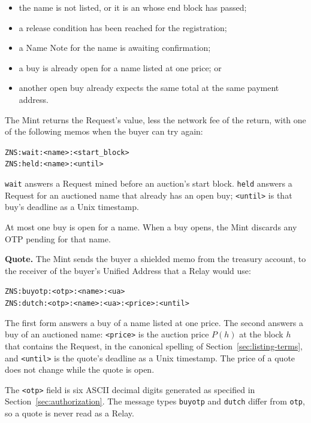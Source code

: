 \begin{itemize}
  \item the name is not listed, or it is an  whose end block has passed;
  \item a release condition has been reached for the registration;
  \item a Name Note for the name is awaiting confirmation;
  \item a buy is already open for a name listed at one price; or
  \item another open buy already expects the same total at the same payment address.
\end{itemize}

The Mint returns the Request's value, less the network fee of the return, with one of the following memos when the buyer can try again:

\begin{center}
\texttt{ZNS:wait:<name>:<start\_block>}\\
\texttt{ZNS:held:<name>:<until>}
\end{center}

\texttt{wait} answers a Request mined before an auction's start block. \texttt{held} answers a Request for an auctioned name that already has an open buy; \texttt{<until>} is that buy's deadline as a Unix timestamp.

At most one buy is open for a name. When a buy opens, the Mint discards any OTP pending for that name.

\textbf{Quote.} The Mint sends the buyer a shielded memo from the treasury account, to the receiver of the buyer's Unified Address that a Relay would use:

\begin{center}
\texttt{ZNS:buyotp:<otp>:<name>:<ua>}\\
\texttt{ZNS:dutch:<otp>:<name>:<ua>:<price>:<until>}
\end{center}

The first form answers a buy of a name listed at one price. The second answers a buy of an auctioned name: \texttt{<price>} is the auction price $P(h)$ at the block $h$ that contains the Request, in the canonical spelling of Section~\ref{sec:listing-terms}, and \texttt{<until>} is the quote's deadline as a Unix timestamp. The price of a quote does not change while the quote is open.

The \texttt{<otp>} field is six ASCII decimal digits generated as specified in Section~\ref{sec:authorization}. The message types \texttt{buyotp} and \texttt{dutch} differ from \texttt{otp}, so a quote is never read as a Relay.

